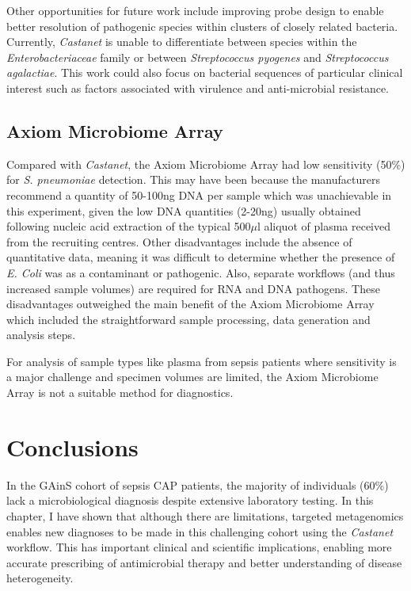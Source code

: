 Other opportunities for future work include improving probe design to enable better resolution of pathogenic species within clusters of closely related bacteria. Currently, \textit{Castanet} is unable to differentiate between species within the \textit{Enterobacteriaceae} family or between \textit{Streptococcus pyogenes} and \textit{Streptococcus agalactiae}. This work could also focus on bacterial sequences of particular clinical interest such as factors associated with virulence and anti-microbial resistance. 

\subsection{Axiom Microbiome Array}
Compared with \textit{Castanet}, the Axiom Microbiome Array had low sensitivity (50\%) for \textit{S. pneumoniae} detection. This may have been because the manufacturers recommend a quantity of 50-100ng DNA per sample which was unachievable in this experiment, given the low DNA quantities (2-20ng) usually obtained following  nucleic acid extraction of the typical 500$\mu$l aliquot of plasma received from the recruiting centres. Other disadvantages include the absence of quantitative data, meaning it was difficult to determine whether the presence of \textit{E. Coli} was as a contaminant or pathogenic. Also, separate workflows (and thus increased sample volumes) are required for RNA and DNA pathogens. These disadvantages outweighed the main benefit of the Axiom Microbiome Array which included the straightforward sample processing, data generation and analysis steps.

For analysis of sample types like plasma from sepsis patients where sensitivity is a major challenge and specimen volumes are limited, the Axiom Microbiome Array is not a suitable method for diagnostics.

\section{Conclusions}
In the GAinS cohort of sepsis CAP patients, the majority of individuals (60\%) lack a microbiological diagnosis despite extensive laboratory testing. In this chapter, I have shown that although there are limitations, targeted metagenomics enables new diagnoses to be made in this challenging cohort using the \textit{Castanet} workflow. This has important clinical and scientific implications, enabling more accurate prescribing of antimicrobial therapy and better understanding of disease heterogeneity. 
